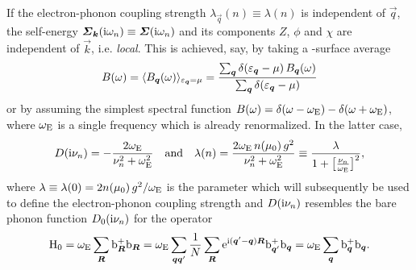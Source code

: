 If the electron-phonon coupling strength $\lambda_{\vec q}(n) \equiv \lambda(n)$
is independent of $\vec q$, the self-energy $\boldsymbol {\varSigma}_{\boldsymbol k}(\mathrm i \omega_n)
\equiv \boldsymbol {\varSigma}(\mathrm i \omega_n)$ and its components $Z$, $\phi$ and $\chi$ are
independent of $\vec k$, i.e. \emph{local}. This is achieved, say, by taking a
-surface average \cite[Eqs.~3.23, 3.24]{AllenMitrovic82}
%
\begin{equation*}
    B(\omega) = \langle B_{\boldsymbol q}(\omega)\rangle_{\varepsilon_{\boldsymbol q} = \mu}
    = \frac
        {\sum_{\boldsymbol q} \delta(\varepsilon_{\boldsymbol q} - \mu) \, B_{\boldsymbol q}(\omega)}
        {\sum_{\boldsymbol q} \delta(\varepsilon_{\boldsymbol q} - \mu)}
\end{equation*}
%
or by assuming the simplest spectral function $B(\omega) = \delta(\omega -
\omega \sb{\text{E}}) - \delta(\omega + \omega \sb{\text{E}})$, where $\omega \sb{\text{E}}$ is a
single  frequency which is already renormalized. In the latter
case,
%
\begin{equation*}
    D(\mathrm i \nu_n)
    = -\frac{2 \omega \sb{\text{E}}}{\nu_n^2 + \omega^2 \sb{\text{E}}}
    \quad \text{and} \quad
    \lambda(n)
    = \frac{2 \omega \sb{\text{E}} \, n(\mu_0) \, g^2}{\nu_n^2 + \omega^2 \sb{\text{E}}}
    \equiv \frac \lambda {1 + \big[ \frac{\nu_n}{\omega \sb{\text{E}}} \big]^2},
\end{equation*}
%
where $\lambda \equiv \lambda(0) = 2 n(\mu_0) \, g^2 / \omega \sb{\text{E}}$ is the
parameter which will subsequently be used to define the electron-phonon coupling
strength and $D(\mathrm i \nu_n)$ resembles the bare phonon  function
$D_0(\mathrm i \nu_n)$ for the  operator
%
\begin{equation*}
    \mathrm H_0
    = \omega \sb{\text{E}} \sum_{\boldsymbol R} \mathrm b_{\boldsymbol R}^+ \mathrm b_{\boldsymbol R}
    = \omega \sb{\text{E}} \sum_{\boldsymbol q \boldsymbol q'} \frac 1 N \sum_{\boldsymbol R}
        \mathrm e^{\mathrm i (\boldsymbol q' - \boldsymbol q) \boldsymbol R} \mathrm b_{\boldsymbol q'}^+ \mathrm b_{\boldsymbol q}
    = \omega \sb{\text{E}} \sum_{\boldsymbol q} \mathrm b_{\boldsymbol q}^+ \mathrm b_{\boldsymbol q}.
\end{equation*}

